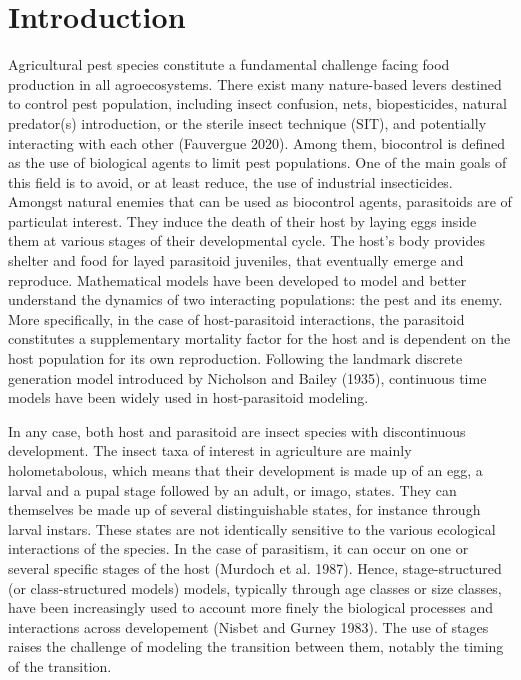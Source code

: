 \documentclass[12pt,a4paper,onecolumn]{article}
\begin{document}
\newpage
\setcounter{page}{1}






\section{Introduction}
\tabto{1 cm} Agricultural pest species constitute a fundamental challenge facing food production in all agroecosystems. There exist many nature-based levers destined to control pest population, including  insect confusion, nets, biopesticides, natural predator(s) introduction, or the sterile insect technique (SIT), and potentially interacting with each other (Fauvergue 2020). Among them, biocontrol is defined as the use of biological agents to limit pest populations. One of the main goals of this field is to avoid, or at least reduce, the use of industrial insecticides. Amongst natural enemies that can be used as biocontrol agents, parasitoids are of particulat interest. They induce the death of their host by laying eggs inside them at various stages of their developmental cycle. The host's body provides shelter and food for layed parasitoid juveniles, that eventually emerge and reproduce. Mathematical models have been developed to model and better understand the dynamics of two interacting populations: the pest and its enemy. More specifically, in the case of host-parasitoid interactions, the parasitoid constitutes a supplementary mortality factor for the host and is dependent on the host population for its own reproduction. Following the landmark discrete generation model introduced by Nicholson and Bailey (1935), continuous time models have been widely used in host-parasitoid modeling.

\tabto{1 cm} In any case, both host and parasitoid are insect species with discontinuous development. The insect taxa of interest in agriculture are mainly holometabolous, which means that their development is made up of an egg, a larval and a pupal stage followed by an adult, or imago, states. They can themselves be made up of several distinguishable states, for instance through larval instars. These states are not identically sensitive to the various ecological interactions of the species. In the case of parasitism, it can occur on one or several specific stages of the host (Murdoch et al. 1987). Hence, stage-structured (or class-structured models) models, typically through age classes or size classes, have been increasingly used to account more finely the biological processes and interactions across developement (Nisbet and Gurney 1983). The use of stages raises the challenge of modeling the transition between them, notably the timing of the transition.
\end{document}
